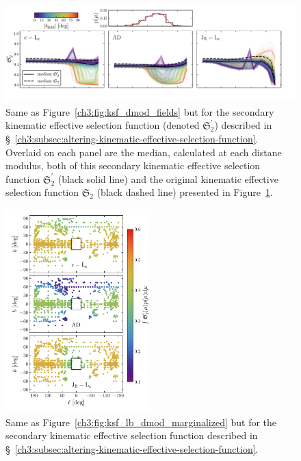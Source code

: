 \begin{figure}
    \centering
    \includegraphics[width=\textwidth]{figure/ch3/ksf2_dmod_fields.pdf}
    \caption{Same as Figure~\ref{ch3:fig:ksf_dmod_fields} but for the secondary kinematic effective selection function (denoted $\mathfrak{S}_{2}^{\prime}$) described in \S~\ref{ch3:subsec:altering-kinematic-effective-selection-function}. Overlaid on each panel are the median, calculated at each distane modulus, both of this secondary kinematic effective selection function $\mathfrak{S}_{2}^{\prime}$ (black solid line) and the original kinematic effective selection function $\mathfrak{S}_{2}$ (black dashed line) presented in Figure~\ref{ch3:fig:ksf2_dmod_fields}.}
    \label{ch3:fig:ksf2_dmod_fields}
\end{figure}

\begin{figure}
    \centering
    \includegraphics[width=0.5\textwidth]{figure/ch3/ksf2_lb_dmod_marginalized.pdf}
    \caption{Same as Figure~\ref{ch3:fig:ksf_lb_dmod_marginalized} but for the secondary kinematic effective selection function described in \S~\ref{ch3:subsec:altering-kinematic-effective-selection-function}.}
    \label{ch3:fig:ksf2_lb_dmod_marginalized}
\end{figure}